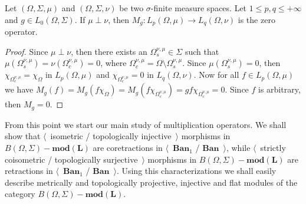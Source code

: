 \begin{proposition}\label{MultOpCharacBtwnTwoSingMeasSp} Let $(\Omega,\Sigma,\mu)$ and $(\Omega,\Sigma,\nu)$ be two $\sigma$-finite measure spaces. Let $1\leq p,q\leq +\infty$ and $g\in L_0(\Omega,\Sigma)$. If $\mu\perp\nu$, then $M_g:L_p(\Omega,\mu)\to L_q(\Omega,\nu)$ is the zero operator.
\end{proposition}
\begin{proof} Since $\mu\perp\nu$, then there exists an $\Omega_s^{\nu,\mu}\in\Sigma$ such that $\mu(\Omega_s^{\nu,\mu})=\nu(\Omega_c^{\nu,\mu})=0$, where $\Omega_c^{\nu,\mu}=\Omega\setminus\Omega_s^{\nu,\mu}$. Since $\mu(\Omega_s^{\nu,\mu})=0$, then $\chi_{\Omega_c^{\nu,\mu}}=\chi_{\Omega}$ in $L_p(\Omega,\mu)$ and $\chi_{\Omega_c^{\nu,\mu}}=0$ in $L_q(\Omega,\nu)$. Now for all $f\in L_p(\Omega,\mu)$ we have $M_g(f)=M_g(f \chi_{\Omega})=M_g(f \chi_{\Omega_c^{\nu,\mu}})=g f\chi_{\Omega_c^{\nu,\mu}}=0$. Since $f$ is arbitrary, then $M_g=0$.
\end{proof}

From this point we start our main study of multiplication operators. We shall show that $\langle$~isometric / topologically injective~$\rangle$ morphisms in $B(\Omega,\Sigma)-\mathbf{mod(L)}$ are coretractions in $\langle$~$\mathbf{Ban}_1$ / $\mathbf{Ban}$~$\rangle$, while $\langle$~strictly coisometric / topologically surjective~$\rangle$ morphisms in $B(\Omega,\Sigma)-\mathbf{mod(L)}$ are retractions in $\langle$~$\mathbf{Ban}_1$ / $\mathbf{Ban}$~$\rangle$. Using this characterizations we shall easily describe metrically and topologically projective, injective and flat modules of the category $B(\Omega,\Sigma)-\mathbf{mod(L)}$.


